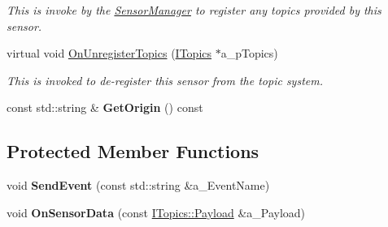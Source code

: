 \begin{DoxyCompactItemize}
\begin{DoxyCompactList}\small\item\em This is invoke by the \hyperlink{class_sensor_manager}{Sensor\+Manager} to register any topics provided by this sensor. \end{DoxyCompactList}\item 
\mbox{\label{class_proxy_sensor_ac9adabdb0749b1ca93dce0d6033a8c0f}} 
virtual void \hyperlink{class_proxy_sensor_ac9adabdb0749b1ca93dce0d6033a8c0f}{On\+Unregister\+Topics} (\hyperlink{class_i_topics}{I\+Topics} $\ast$a\+\_\+p\+Topics)
\begin{DoxyCompactList}\small\item\em This is invoked to de-\/register this sensor from the topic system. \end{DoxyCompactList}\item 
\mbox{\label{class_proxy_sensor_ad0724f2580caf1581ac854b5b8a8430a}} 
const std\+::string \& {\bfseries Get\+Origin} () const
\end{DoxyCompactItemize}
\subsection*{Protected Member Functions}
\begin{DoxyCompactItemize}
\item 
\mbox{\label{class_proxy_sensor_a2f5579bb82a81ac9c8f0751adf336983}} 
void {\bfseries Send\+Event} (const std\+::string \&a\+\_\+\+Event\+Name)
\item 
\mbox{\label{class_proxy_sensor_a8b1cd12f19375013e0a6b46dbb71e905}} 
void {\bfseries On\+Sensor\+Data} (const \hyperlink{struct_i_topics_1_1_payload}{I\+Topics\+::\+Payload} \&a\+\_\+\+Payload)
\end{DoxyCompactItemize}

